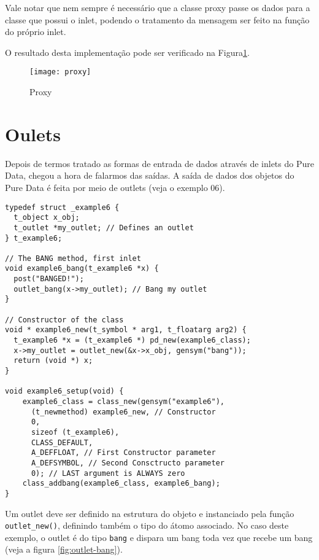 Vale notar que nem sempre é necessário que a classe proxy passe os dados para a
classe que possui o inlet, podendo o tratamento da mensagem ser feito na função
do próprio inlet.

O resultado desta implementação pode ser verificado na Figura\ref{fig:proxy}.

\begin{figure}[h!]
\centering
\texttt{[image: proxy]}
\caption{Proxy}
\label{fig:proxy}
\end{figure}

\section{Oulets}

Depois de termos tratado as formas de entrada de dados através de inlets do
Pure Data, chegou a hora de falarmos das saídas. A saída de dados dos objetos
do Pure Data é feita por meio de outlets (veja o exemplo 06).

\begin{lstlisting}[caption=Exemplo de outlet]
typedef struct _example6 {
  t_object x_obj;
  t_outlet *my_outlet; // Defines an outlet
} t_example6;

// The BANG method, first inlet
void example6_bang(t_example6 *x) {
  post("BANGED!");
  outlet_bang(x->my_outlet); // Bang my outlet
}

// Constructor of the class
void * example6_new(t_symbol * arg1, t_floatarg arg2) {
  t_example6 *x = (t_example6 *) pd_new(example6_class);
  x->my_outlet = outlet_new(&x->x_obj, gensym("bang"));
  return (void *) x;
}

void example6_setup(void) {
    example6_class = class_new(gensym("example6"),
      (t_newmethod) example6_new, // Constructor
      0, 
      sizeof (t_example6),
      CLASS_DEFAULT,
      A_DEFFLOAT, // First Constructor parameter
      A_DEFSYMBOL, // Second Consctructo parameter
      0); // LAST argument is ALWAYS zero
    class_addbang(example6_class, example6_bang);
}
\end{lstlisting}

Um outlet deve ser definido na estrutura do objeto e instanciado pela função
\texttt{outlet\_new()}, definindo também o tipo do átomo associado.
No caso deste exemplo, o outlet é do tipo \texttt{bang} e dispara um bang toda
vez que recebe um bang (veja a figura \ref{fig:outlet-bang}).

